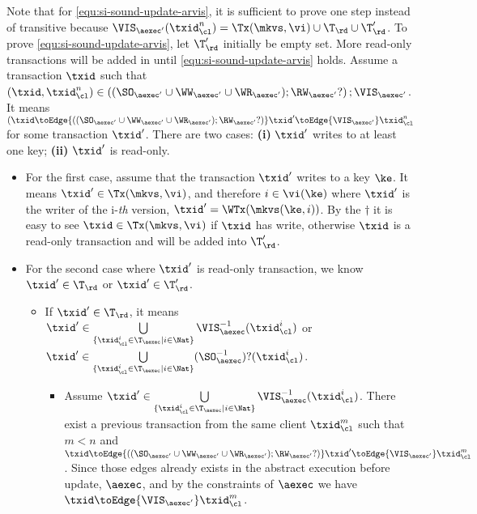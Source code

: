 Note that for \cref{equ:si-sound-update-arvis}, it is sufficient to prove one step instead of transitive 
because \( \VIS_{\aexec'}(\txid_\cl^n) =  \Tx(\mkvs, \vi) \cup \T_\rd \cup \T'_\rd \).
To prove \cref{equ:si-sound-update-arvis}, 
let \( \T'_\rd \) initially be empty set.
More read-only transactions will be added in until \cref{equ:si-sound-update-arvis} holds.
Assume a transaction \( \txid \) such that \( (\txid, \txid_\cl^n) \in \left( (\SO_{\aexec'} \cup \WW_{\aexec'} \cup \WR_{\aexec'} ) ; \RW_{\aexec'}? \right) ; \VIS_{\aexec'} \).
It means \( (\txid \toEdge{\left( (\SO_{\aexec'} \cup \WW_{\aexec'} \cup \WR_{\aexec'} ) ; \RW_{\aexec'}? \right) } \txid' \toEdge{\VIS_{\aexec'}}  \txid_\cl^n \) for some transaction \( \txid' \).
There are two cases: \textbf{(i)} \( \txid' \) writes to at least one key; \textbf{(ii)} \( \txid' \) is read-only.
\begin{itemize}
\item For the first case, assume that the transaction \( \txid' \) writes to a key \( \ke \).
It means \(  \txid' \in \Tx(\mkvs, \vi) \), 
and therefore \( i \in \vi(\ke) \) where \( \txid' \) is the writer of the i-\emph{th} version, \ie \( \txid' = \WTx(\mkvs(\ke, i)) \).
By the \( \dagger \) it is easy to see \( \txid \in \Tx(\mkvs,\vi) \) if \( \txid \) has write,
otherwise \( \txid \) is a read-only transaction and will be added into \( \T'_\rd \).
\item For the second case where \( \txid' \) is read-only transaction, we know \( \txid' \in \T_\rd \) or \( \txid' \in \T'_\rd \).
    \begin{itemize}
    \item If \( \txid' \in \T_\rd \), it means \( \txid' \in \bigcup\limits_{\{\txid_{\cl}^{i} \in \T_{\aexec} \mid i \in \Nat\}} \VIS_{\aexec}^{-1}(\txid^i_\cl) \) or  \( \txid' \in \bigcup\limits_{\{\txid_{\cl}^{i} \in \T_{\aexec} \mid i \in \Nat\}} (\SO_{\aexec}^{-1})?(\txid^i_\cl) \).
        \begin{itemize}
        \item Assume \( \txid' \in \bigcup\limits_{\{\txid_{\cl}^{i} \in \T_{\aexec} \mid i \in \Nat\}} \VIS_{\aexec}^{-1}(\txid^i_\cl) \).
            There exist a previous transaction from the same client \( \txid_\cl^m\) such that \( m < n \) and \( \txid \toEdge{\left( (\SO_{\aexec'} \cup \WW_{\aexec'} \cup \WR_{\aexec'} ) ; \RW_{\aexec'}? \right) } \txid' \toEdge{\VIS_{\aexec'}}  \txid_\cl^m \).
            Since those edges already exists in the abstract execution before update, \( \aexec\), and by the constraints of \( \aexec \) we have \( \txid \toEdge{\VIS_{\aexec'}} \txid_\cl^m\).

\end{itemize}
\end{itemize}
\end{itemize}
